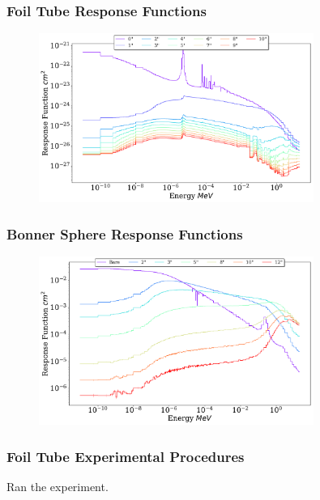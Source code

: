\documentclass[fleqn]{beamer}
\begin{document}
\begin{frame}
\frametitle{Foil Tube Response Functions}

\begin{figure}
\centering
\includegraphics[width = 0.8\textwidth]{ft_au}
\caption{}
\end{figure}

\end{frame}

\begin{frame}
\frametitle{Bonner Sphere Response Functions}

\begin{figure}
\centering
\includegraphics[width = 0.8\textwidth]{bs}
\caption{}
\end{figure}

\end{frame}

\begin{frame}
\frametitle{Foil Tube Experimental Procedures}

Ran the experiment.

\end{frame}
\end{document}
